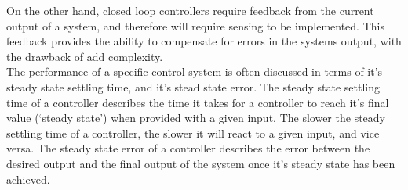 On the other hand, closed loop controllers require feedback from the current output of a system, and therefore will require sensing to be implemented. This feedback provides the ability to compensate for errors in the systems output, with the drawback of add complexity.\\

The performance of a specific control system is often discussed in terms of it's steady state settling time, and it's stead state error. The steady state settling time of a controller describes the time it takes for a controller to reach it's final value (`steady state') when provided with a given input. The slower the steady settling time of a controller, the slower it will react to a given input, and vice versa. The steady state error of a controller describes the error between the desired output and the final output of the system once it's steady state has been achieved. 